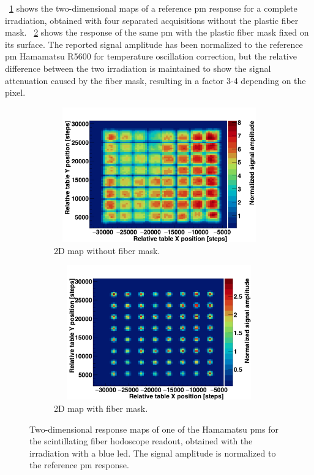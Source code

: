 \figurename~\ref{chap3::fig::hodoPMchar2DnoMask} shows the two-dimensional maps of a reference \gls{pm} response for a complete irradiation, obtained with four separated acquisitions without the plastic fiber mask. \figurename~\ref{chap3::fig::hodoPMchar2DwithMask} shows the response of the same \gls{pm} with the plastic fiber mask fixed on its surface. The reported signal amplitude has been normalized to the reference \gls{pm} Hamamatsu R5600 for temperature oscillation correction, but the relative difference between the two irradiation is maintained to show the signal attenuation caused by the fiber mask, resulting in a factor 3-4 depending on the pixel.\\ 

\begin{figure}
\begin{subfigure}[t]{.5\textwidth}
\centering
\includegraphics[width=1\textwidth, height = 5.8cm ]{03_GraphicFiles/chapter3_CLaRySproto/Hodoscope/PMchar/Maps_noMask/2DMap_PM2_notNorm.png}
\caption{2D map without fiber mask.}
\label{chap3::fig::hodoPMchar2DnoMask}
\end{subfigure}
\begin{subfigure}[t]{.5\textwidth}
\centering
\includegraphics[width=1\textwidth, height = 5.8cm ]{03_GraphicFiles/chapter3_CLaRySproto/Hodoscope/PMchar/Maps_withMask/2DMap_PM2_notNorm.png}
\caption{2D map with fiber mask.}
\label{chap3::fig::hodoPMchar2DwithMask}
\end{subfigure}
\caption{Two-dimensional response maps of one of the Hamamatsu \glspl{pm} for the scintillating fiber hodoscope readout, obtained with the irradiation with a blue 	\gls{led}. The signal amplitude is normalized to the reference \gls{pm} response.}
\label{chap3::fig::hodoPMchar2Dmaps}
\end{figure}


